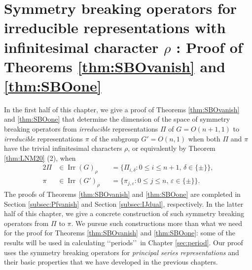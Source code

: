 \newpage
\section{Symmetry breaking operators
 for irreducible representations
 with infinitesimal character $\rho$ :
 Proof of Theorems \ref{thm:SBOvanish}
 and \ref{thm:SBOone}}
\label{sec:pfSBrho}
In the first half of this chapter, 
 we give a proof of Theorems \ref{thm:SBOvanish}
 and \ref{thm:SBOone}
 that determine the dimension of the space of symmetry breaking operators from
 {\it{irreducible}} representations $\Pi$ of $G=O(n+1,1)$
 to {\it{irreducible}} representations $\pi$ of the subgroup $G'=O(n,1)$
 when both $\Pi$ and $\pi$ have the trivial infinitesimal characters $\rho$,
 or equivalently
 by Theorem \ref{thm:LNM20} (2), 
 when 
\begin{alignat*}{2}
\Pi 
&\in {\operatorname{Irr}}(G)_{\rho} 
&&=\{\Pi_{i,\delta} : 0 \le i \le n+1, \,\delta \in \{\pm\}\}, 
\\
\pi 
&\in {\operatorname{Irr}}(G')_{\rho} 
&&=\{\pi_{j,\varepsilon}: 0 \le j \le n, \,\varepsilon \in \{\pm\}\}.  
\end{alignat*} 
The proofs of Theorems \ref{thm:SBOvanish} and \ref{thm:SBOone} are completed
 in Section \ref{subsec:Pfvanish} and Section \ref{subsec:IJdual}, 
 respectively.  
In the latter half of this chapter,
 we give a concrete construction of such symmetry breaking operators from 
 $\Pi$ to $\pi$.  
We pursue such constructions 
 more than what we need for the proof
 for Theorems \ref{thm:SBOvanish} and \ref{thm:SBOone}:
 some of the results will be used 
 in calculating \lq\lq{periods}\rq\rq\
 in Chapter \ref{sec:period}.  
Our proof uses the symmetry breaking operators
 for {\it{principal series representations}}
 and their basic properties
 that we have developed in the previous chapters.  


